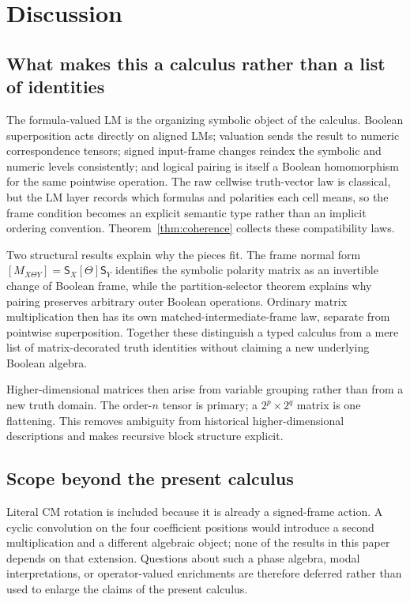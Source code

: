 \documentclass[11pt]{article}
\theoremstyle{definition}
\theoremstyle{remark}
\begin{document}
\section{Discussion}

\subsection{What makes this a calculus rather than a list of identities}

The formula-valued LM is the organizing symbolic object of the calculus.  Boolean superposition acts directly on aligned LMs; valuation sends the result to numeric correspondence tensors; signed input-frame changes reindex the symbolic and numeric levels consistently; and logical pairing is itself a Boolean homomorphism for the same pointwise operation.  The raw cellwise truth-vector law is classical, but the LM layer records which formulas and polarities each cell means, so the frame condition becomes an explicit semantic type rather than an implicit ordering convention.  Theorem~\ref{thm:coherence} collects these compatibility laws.

Two structural results explain why the pieces fit.  The frame normal form $[M_{X\Theta Y}]=\mathsf S_X[\Theta]\mathsf S_Y$ identifies the symbolic polarity matrix as an invertible change of Boolean frame, while the partition-selector theorem explains why pairing preserves arbitrary outer Boolean operations.  Ordinary matrix multiplication then has its own matched-intermediate-frame law, separate from pointwise superposition.  Together these distinguish a typed calculus from a mere list of matrix-decorated truth identities without claiming a new underlying Boolean algebra.

Higher-dimensional matrices then arise from variable grouping rather than from a new truth domain.  The order-$n$ tensor is primary; a $2^p\times2^q$ matrix is one flattening.  This removes ambiguity from historical higher-dimensional descriptions and makes recursive block structure explicit.

\subsection{Scope beyond the present calculus}

Literal CM rotation is included because it is already a signed-frame action.  A cyclic convolution on the four coefficient positions would introduce a second multiplication and a different algebraic object; none of the results in this paper depends on that extension.  Questions about such a phase algebra, modal interpretations, or operator-valued enrichments are therefore deferred rather than used to enlarge the claims of the present calculus.
\end{document}
